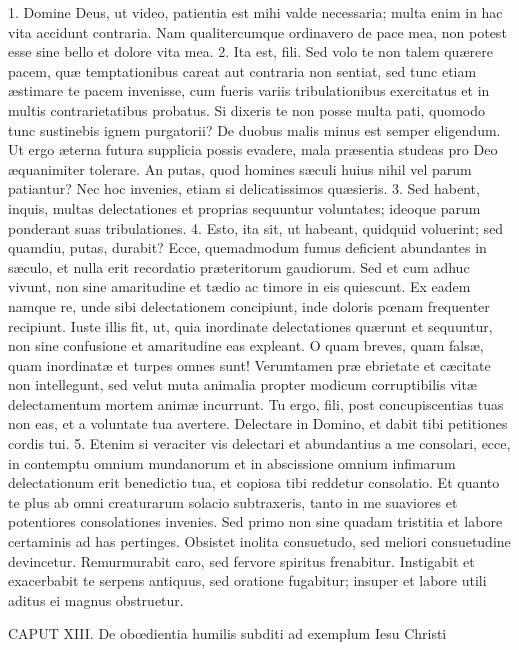 \documentclass[twoside]{article}
\begin{document}
1. Domine Deus, ut video, patientia est mihi valde necessaria; multa enim in hac vita accidunt contraria. Nam qualitercumque ordinavero de pace mea, non potest esse sine bello et dolore vita mea.
2. Ita est, fili. Sed volo te non talem quærere pacem, quæ temptationibus careat aut contraria non sentiat, sed tunc etiam æstimare te pacem invenisse, cum fueris variis tribulationibus exercitatus et in multis contrarietatibus probatus. Si dixeris te non posse multa pati, quomodo tunc sustinebis ignem purgatorii? De duobus malis minus est semper eligendum. Ut ergo æterna futura supplicia possis evadere, mala præsentia studeas pro Deo æquanimiter tolerare. An putas, quod homines sæculi huius nihil vel parum patiantur? Nec hoc invenies, etiam si delicatissimos quæsieris.
3. Sed habent, inquis, multas delectationes et proprias sequuntur voluntates; ideoque parum ponderant suas tribulationes.
4. Esto, ita sit, ut habeant, quidquid voluerint; sed quamdiu, putas, durabit? Ecce, quemadmodum fumus deficient abundantes in sæculo, et nulla erit recordatio præteritorum gaudiorum. Sed et cum adhuc vivunt, non sine amaritudine et tædio ac timore in eis quiescunt. Ex eadem namque re, unde sibi delectationem concipiunt, inde doloris pœnam frequenter recipiunt. Iuste illis fit, ut, quia inordinate delectationes quærunt et sequuntur, non sine confusione et amaritudine eas expleant. O quam breves, quam falsæ, quam inordinatæ et turpes omnes sunt! Verumtamen præ ebrietate et cæcitate non intellegunt, sed velut muta animalia propter modicum corruptibilis vitæ delectamentum mortem animæ incurrunt. Tu ergo, fili, post concupiscentias tuas non eas, et a voluntate tua avertere. Delectare in Domino, et dabit tibi petitiones cordis tui.
5. Etenim si veraciter vis delectari et abundantius a me consolari, ecce, in contemptu omnium mundanorum et in abscissione omnium infimarum delectationum erit benedictio tua, et copiosa tibi reddetur consolatio. Et quanto te plus ab omni creaturarum solacio subtraxeris, tanto in me suaviores et potentiores consolationes invenies. Sed primo non sine quadam tristitia et labore certaminis ad has pertinges. Obsistet inolita consuetudo, sed meliori consuetudine devincetur. Remurmurabit caro, sed fervore spiritus frenabitur. Instigabit et exacerbabit te serpens antiquus, sed oratione fugabitur; insuper et labore utili aditus ei magnus obstruetur.


CAPUT XIII.
De obœdientia humilis subditi ad exemplum Iesu Christi
\end{document}
